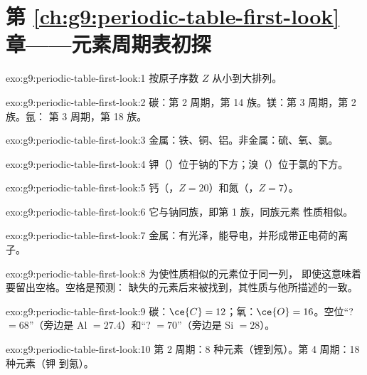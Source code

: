  \section*{第 \ref{ch:g9:periodic-table-first-look} 章——元素周期表初探}

\begin{solution}{exo:g9:periodic-table-first-look:1}
按原子序数 $Z$ 从小到大排列。
\end{solution}

\begin{solution}{exo:g9:periodic-table-first-look:2}
碳：第 2 周期，第 14 族。镁：第 3 周期，第 2 族。氩：
第 3 周期，第 18 族。
\end{solution}

\begin{solution}{exo:g9:periodic-table-first-look:3}
金属：铁、铜、铝。非金属：硫、氧、氯。
\end{solution}

\begin{solution}{exo:g9:periodic-table-first-look:4}
钾（）位于钠的下方；溴（）位于氯的下方。
\end{solution}

\begin{solution}{exo:g9:periodic-table-first-look:5}
钙（，$Z = 20$）和氮（，$Z = 7$）。
\end{solution}

\begin{solution}{exo:g9:periodic-table-first-look:6}
它与钠同族，即第 1 族，同族元素
性质相似。
\end{solution}

\begin{solution}{exo:g9:periodic-table-first-look:7}
金属：有光泽，能导电，并形成带正电荷的离子。
\end{solution}

\begin{solution}{exo:g9:periodic-table-first-look:8}
为使性质相似的元素位于同一列，
即使这意味着要留出空格。空格是预测：
缺失的元素后来被找到，其性质与他所描述的一致。
\end{solution}

\begin{solution}{exo:g9:periodic-table-first-look:9}
碳：$\ce{C} = 12$；氧：$\ce{O} = 16$。空位“? $= 68$”（旁边是
Al $= 27.4$）和“? $= 70$”（旁边是 Si $= 28$）。
\end{solution}

\begin{solution}{exo:g9:periodic-table-first-look:10}
第 2 周期：8 种元素（锂到氖）。第 4 周期：18 种元素（钾
到氪）。
\end{solution}

